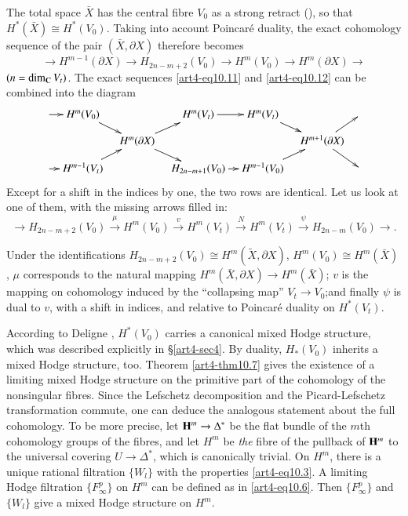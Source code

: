 The total space $\bar{X}$ has the central fibre $V_0$ as a strong retract (\cf \cite{art4-key8}), so that $H^\ast (\bar{X}) \cong H^\ast (V_0)$. Taking into account Poincar\'e duality, the exact cohomology sequence of the pair $(\bar{X}, \partial X)$ therefore becomes 
\begin{equation}\label{art4-eq10.12}
\longrightarrow H^{m-1} (\partial X) \longrightarrow H_{2n - m+2} (V_0) \longrightarrow  H^m (V_0) \longrightarrow  H^m (\partial X) \longrightarrow  
\end{equation}
$(n = \dim_{\mathbf{C}} V_t)$. The exact sequences \eqref{art4-eq10.11} and \eqref{art4-eq10.12} can be combined into the diagram
\begin{equation}
\vcenter{
\xymatrix@=.32cm{
\ar[r] & H^m (V_0)  \ar[dr] & & H^m (V_t) \ar[r] & H^m (V_t) \ar[dr] & & \\
&& H^m (\partial X) \ar[ur]\ar[dr] &&& H^{m+1} (\partial X) \ar[dr] \ar[ur] &\\
\ar[r] & H^{m-1} (V_t)  \ar[ur] & & H_{2n-m+1}  (V_0) \ar[r] & H^{m-1} (V_0) \ar[ur] & & 
}}
\end{equation}
Except for a shift in the indices by one, the two rows are identical. Let us look at one of them, with the missing arrows filled in:
\begin{equation}\label{art4-eq10.14}
\longrightarrow H_{2n-m+2} (V_0) \xrightarrow{\mu} H^m (V_0) \xrightarrow{v} H^m (V_t) \xrightarrow{N}  H^{m} (V_t) \xrightarrow{\psi}  H_{2n-m}  (V_0) \longrightarrow .
\end{equation}

Under the identifications $H_{2n - m +2 } (V_0) \cong H^m (\tilde{X}, \partial X)$, $H^m (V_0) \cong H^m (\bar{X})$, $\mu$ corresponds to the natural mapping $H^m (\bar{X}, \partial X) \to H^m (\bar{X})$; $v$ is the mapping on cohomology induced by the ``collapsing map'' $V_t \to V_0$;\pageoriginale and finally $\psi$ is dual to $v$, with a shift in indices, and relative to Poincar\'e duality on $H^\ast(V_t)$.

According to Deligne \cite{art4-key14}, $H^\ast (V_0)$ carries a canonical mixed Hodge structure, which was described explicitly in \S\ref{art4-sec4}. By duality, $H_\ast(V_0)$ inherits a mixed Hodge structure, too. Theorem \eqref{art4-thm10.7} gives the existence of a limiting mixed Hodge structure on the primitive part of the cohomology of the nonsingular fibres. Since the Lefschetz decomposition and the Picard-Lefschetz transformation commute, one can deduce the analogous statement about the full cohomology. To be more precise, let $\mathbf{H}^m \to \Delta^\ast$ be the flat bundle of the $m$th cohomology groups of the fibres, and let $H^m$ be \textit{the} fibre of the pullback of $\mathbf{H}^m$ to the universal covering $U \to \Delta^\ast$, which is canonically trivial. On $H^m$, there is a unique rational filtration $\{W_l\}$ with the properties \eqref{art4-eq10.3}. A limiting Hodge filtration $\{F^p_\infty\}$ on $H^m$ can be defined as in \eqref{art4-eq10.6}. Then $\{F^p_\infty\}$ and $\{W_l\}$ give a mixed Hodge structure on $H^m$.

